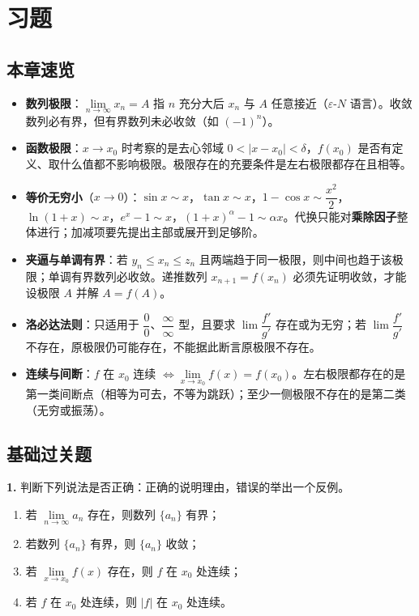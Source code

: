 \section{习题}

\subsection{本章速览}

\begin{itemize}
  \item \textbf{数列极限}：$\lim\limits_{n\to\infty}x_n=A$ 指 $n$ 充分大后 $x_n$ 与 $A$ 任意接近（$\varepsilon$-$N$ 语言）。收敛数列必有界，但有界数列未必收敛（如 $(-1)^n$）。
  \item \textbf{函数极限}：$x\to x_0$ 时考察的是去心邻域 $0<|x-x_0|<\delta$，$f(x_0)$ 是否有定义、取什么值都不影响极限。极限存在的充要条件是左右极限都存在且相等。
  \item \textbf{等价无穷小}（$x\to0$）：$\sin x\sim x$，$\tan x\sim x$，$1-\cos x\sim \dfrac{x^2}{2}$，$\ln(1+x)\sim x$，$e^x-1\sim x$，$(1+x)^{\alpha}-1\sim \alpha x$。代换只能对\textbf{乘除因子}整体进行；加减项要先提出主部或展开到足够阶。
  \item \textbf{夹逼与单调有界}：若 $y_n\le x_n\le z_n$ 且两端趋于同一极限，则中间也趋于该极限；单调有界数列必收敛。递推数列 $x_{n+1}=f(x_n)$ 必须先证明收敛，才能设极限 $A$ 并解 $A=f(A)$。
  \item \textbf{洛必达法则}：只适用于 $\dfrac{0}{0}$、$\dfrac{\infty}{\infty}$ 型，且要求 $\lim\dfrac{f'}{g'}$ 存在或为无穷；若 $\lim\dfrac{f'}{g'}$ 不存在，原极限仍可能存在，不能据此断言原极限不存在。
  \item \textbf{连续与间断}：$f$ 在 $x_0$ 连续 $\Leftrightarrow \lim\limits_{x\to x_0}f(x)=f(x_0)$。左右极限都存在的是第一类间断点（相等为可去，不等为跳跃）；至少一侧极限不存在的是第二类（无穷或振荡）。
\end{itemize}

\subsection{基础过关题}

\textbf{1.} 判断下列说法是否正确：正确的说明理由，错误的举出一个反例。
\begin{enumerate}
  \item[(1)] 若 $\lim\limits_{n\to\infty}a_n$ 存在，则数列 $\{a_n\}$ 有界；
  \item[(2)] 若数列 $\{a_n\}$ 有界，则 $\{a_n\}$ 收敛；
  \item[(3)] 若 $\lim\limits_{x\to x_0}f(x)$ 存在，则 $f$ 在 $x_0$ 处连续；
  \item[(4)] 若 $f$ 在 $x_0$ 处连续，则 $|f|$ 在 $x_0$ 处连续。
\end{enumerate}

